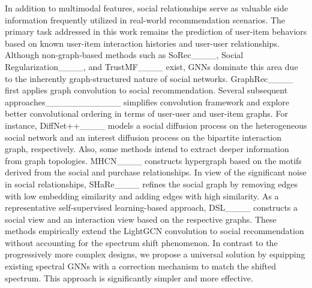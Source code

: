 In addition to multimodal features, social relationships serve as valuable side information frequently utilized in real-world recommendation scenarios. 
The primary task addressed in this work remains the prediction of user-item behaviors based on known user-item interaction histories and user-user relationships. 
Although non-graph-based methods such as SoRec____, Social Regularization____, and TrustMF____ exist, 
GNNs dominate this area due to the inherently graph-structured nature of social networks.
GraphRec____ first applies graph convolution to social recommendation.
Several subsequent approaches____________ simplifies convolution framework and explore better convolutional ordering in terms of user-user and user-item graphs.
For instance, DiffNet++____ models a social diffusion process on the heterogeneous social network
and an interest diffusion process on the bipartite interaction graph, respectively.
Also, some methods intend to extract deeper information from graph topologies.
MHCN____ constructs hypergraph based on the motifs derived from the social and purchase relationships.
In view of the significant noise in social relationships, 
SHaRe____ refines the social graph by removing edges with low embedding similarity and adding edges with high similarity. 
As a representative self-supervised learning-based approach, 
DSL____ constructs a social view and an interaction view based on the respective graphs. 
These methods empirically extend the LightGCN convolution to social recommendation without accounting for the spectrum shift phenomenon.
In contrast to the progressively more complex designs, 
we propose a universal solution by equipping existing spectral GNNs with a correction mechanism to match the shifted spectrum. 
This approach is significantly simpler and more effective.